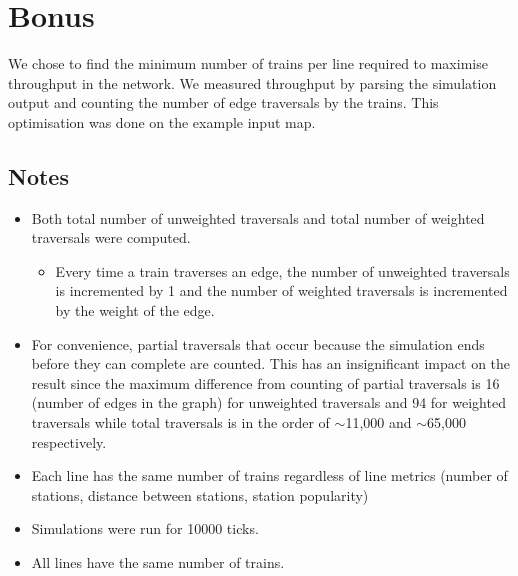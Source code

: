 \documentclass[a4paper,12pt]{article}
\begin{document}
\section{Bonus}

We chose to find the minimum number of trains per line required to maximise throughput in the network. We measured throughput by parsing the simulation output and counting the number of edge traversals by the trains. This optimisation was done on the example input map.

\subsection{Notes}
\begin{itemize}
	\item Both total number of unweighted traversals and total number of weighted traversals were computed.
	      \begin{itemize}
		      \item Every time a train traverses an edge, the number of unweighted traversals is incremented by 1 and the number of weighted traversals is incremented by the weight of the edge.
	      \end{itemize}
	\item For convenience, partial traversals that occur because the simulation ends before they can complete are counted. This has an insignificant impact on the result since the maximum difference from counting of partial traversals is 16 (number of edges in the graph) for unweighted traversals and 94 for weighted traversals while total traversals is in the order of $\sim$11,000 and $\sim$65,000 respectively.
	\item Each line has the same number of trains regardless of line metrics (number of stations, distance between stations, station popularity)
	\item Simulations were run for 10000 ticks.
	\item All lines have the same number of trains.
\end{itemize}
\end{document}
